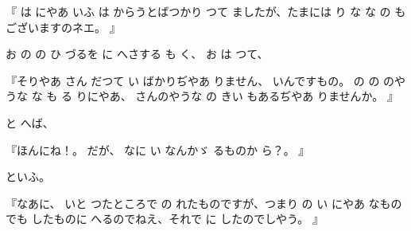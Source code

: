 
『
は
にやあ
いふ
は
からうとばつかり
つて
ましたが、たまには
り
な
な
の
もございますのネエ。
』

お
の
の
ひ
づるを
に
へさする
も
く、
お
は
つて、

『そりやあ
さん
だつて
い
ばかりぢやあ
りません、
いんですもの。
の
の
のやうな
な
も
る
りにやあ、
さんのやうな
の
きい
もあるぢやあ
りませんか。
』

と
へば、

『ほんにね！。
だが、
なに
い
なんかゞ
るものか
ら？。
』

といふ。

『なあに、
いと
つたところで
の
れたものですが、つまり
の
い
にやあ
なものでも
したものに
へるのでねえ、それで
に
したのでしやう。
』

